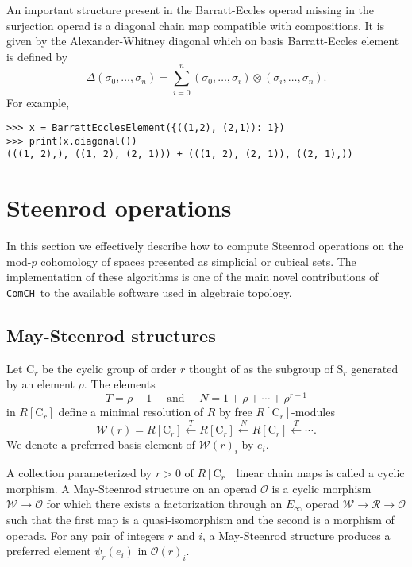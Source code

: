 \documentclass{amsart}
\renewcommand{\S}{\mathrm{S}}
\newcommand{\C}{\mathrm{C}}
\newcommand{\comch}{\texttt{ComCH}}
\begin{document}
An important structure present in the Barratt-Eccles operad missing in the surjection operad is a diagonal chain map compatible with compositions.
It is given by the Alexander-Whitney diagonal which on basis Barratt-Eccles element is defined by
\begin{equation*}
\Delta(\sigma_0, \dots, \sigma_n) = \sum_{i=0}^n (\sigma_0, \dots, \sigma_i) \otimes (\sigma_i, \dots, \sigma_n).
\end{equation*}
For example,

\begin{Verbatim}[frame=lines, samepage=true]
>>> x = BarrattEcclesElement({((1,2), (2,1)): 1})
>>> print(x.diagonal())
(((1, 2),), ((1, 2), (2, 1))) + (((1, 2), (2, 1)), ((2, 1),))
\end{Verbatim}

\section{Steenrod operations} \label{s: steenrod operations}

In this section we effectively describe how to compute Steenrod operations on the mod-$p$ cohomology of spaces presented as simplicial or cubical sets.
The implementation of these algorithms is one of the main novel contributions of \comch\, to the available software used in algebraic topology.

\subsection{May-Steenrod structures}

Let $\C_r$ be the cyclic group of order $r$ thought of as the subgroup of $\S_r$ generated by an element $\rho$.
The elements
\begin{equation*}
T = \rho-1 \quad \text{ and } \quad N = 1+\rho+\cdots+\rho^{r-1}
\end{equation*}
in $R[\C_r]$ define a minimal resolution of $R$ by free $R[\C_r]$-modules
\begin{equation*}
\mathcal W(r) = R[\C_r] \stackrel{T}{\longleftarrow} R[\C_r] \stackrel{N}{\longleftarrow} R[\C_r] \stackrel{T}{\longleftarrow} \cdots.
\end{equation*}
We denote a preferred basis element of $\mathcal W(r)_i$ by $e_i$.

A collection parameterized by $r > 0$ of $R[\C_r]$ linear chain maps is called a cyclic morphism.
A May-Steenrod structure on an operad $\mathcal O$ is a cyclic morphism $\mathcal W \to \mathcal O$ for which there exists a factorization through an $E_\infty$ operad $\mathcal W \to \mathcal R \to \mathcal O$ such that the first map is a quasi-isomorphism and the second is a morphism of operads.
For any pair of integers $r$ and $i$, a May-Steenrod structure produces a preferred element $\psi_r(e_i)$ in $\mathcal O(r)_i$.
\end{document}
